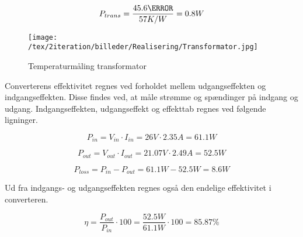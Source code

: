 \begin{equation}
P_{trans} = \frac{45.6\degreeCelsius}{57K/W} = 0.8W
\end{equation}

\begin{figure}[H]
	\center
	\texttt{[image: /tex/2iteration/billeder/Realisering/Transformator.jpg]}
	\caption{Temperaturmåling transformator}
	\label{fig:temp_trans}
\end{figure}

Converterens effektivitet regnes ved forholdet mellem udgangseffekten og indgangseffekten. Disse findes ved, at måle strømme og spændinger på indgang og udgang. Indgangseffekten, udgangseffekt og effekttab regnes ved følgende ligninger.

\begin{equation}
P_{in} = V_{in} \cdot I_{in} = 26V \cdot 2.35A = 61.1W
\end{equation}

\begin{equation}
P_{out} = V_{out} \cdot I_{out} = 21.07V \cdot 2.49A = 52.5W
\end{equation}

\begin{equation}
P_{loss} = P_{in} - P_{out} = 61.1W - 52.5W = 8.6W
\end{equation}

\noindent Ud fra indgangs- og udgangseffekten regnes også den endelige effektivitet i converteren. 

\begin{equation}
\eta = \frac{P_{out}}{P_{in}} \cdot 100 = \frac{52.5W}{61.1W} \cdot 100 = 85.87\percent
\end{equation}

